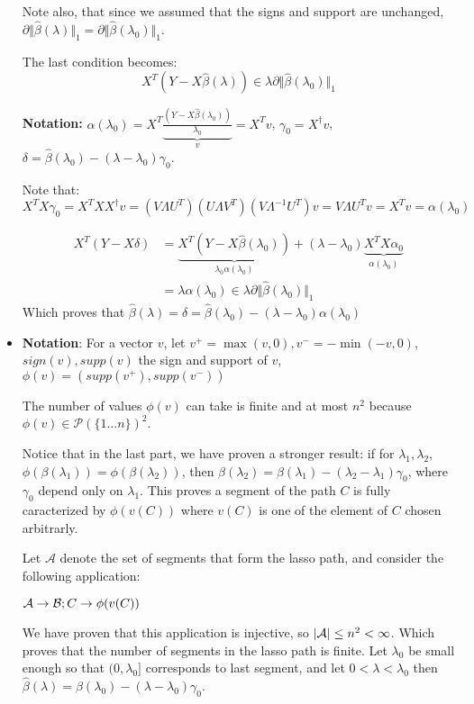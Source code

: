 \documentclass[12pt]{article}
\newcommand{\hbeta}{\hat \beta }
\newcommand{\norm}[1]{\Vert #1 \Vert}
\begin{document}
\begin{itemize}
  Note also, that since we assumed that the signs and support are unchanged, $\partial \norm{\hat \beta(\lambda)}_1 = \partial \norm{\hat \beta(\lambda_0)}_1$.
  
  The last condition becomes:
  $$X^T(Y - X\hat \beta(\lambda)) \in \lambda \partial \norm{\hat \beta(\lambda_0)}_1$$


  \textbf{Notation: } $ \alpha(\lambda_0) =  X^T \underbrace{\frac{(Y - X\hat \beta(\lambda_0))}{\lambda_0}}_v = X^Tv$,  $\gamma_0 = X^{\dagger} v$, $\delta = \hat \beta(\lambda_0) - (\lambda - \lambda_0) \gamma_0$. 

  Note that:
  $$X^TX\gamma_0 = X^T XX^{\dagger} v = (V \Lambda U^T) (U\Lambda V^T)  (V \Lambda^{-1} U^T) v = V \Lambda U^T v = X^T v = \alpha(\lambda_0)$$
  
  
  \begin{align*}
    X^T(Y - X\delta)
    &= \underbrace{X^T(Y - X\hat \beta(\lambda_0))}_{\lambda_0 \alpha(\lambda_0)} + (\lambda - \lambda_0) \underbrace{X^T X \alpha_0}_{\alpha(\lambda_0)}
    \\&= \lambda \alpha(\lambda_0) \in \lambda \partial \norm{\hat \beta(\lambda_0)}_1
  \end{align*}
  Which proves that $\hat \beta(\lambda) = \delta = \hat \beta(\lambda_0) - (\lambda - \lambda_0) \alpha(\lambda_0)$

  
\item
  \textbf{Notation}: For a vector $v$, let $v^+ = \max(v, 0), v^- = -\min(-v, 0)$, $sign(v), supp(v)$ the sign and support of $v$, $\phi(v) = (supp(v^+), supp(v^-))$
  
  The number of values $\phi(v)$ can take is finite and at most $n^2$ because $\phi(v) \in \mathcal P(\{1 \ldots n\})^2$.

  Notice that in the last part, we have proven a stronger result:
  if for $\lambda_1, \lambda_2$, $\phi(\beta(\lambda_1)) = \phi(\beta(\lambda_2))$, then $\beta(\lambda_2) = \beta(\lambda_1) - (\lambda_2 - \lambda_1) \gamma_0$, where $\gamma_0$ depend only on $\lambda_1$. This proves a segment of the path $C$ is fully caracterized by $\phi(v(C))$ where $v(C)$ is one of the element of $C$ chosen arbitrarly.
  

  Let $\mathcal A$ denote the set of segments that form the lasso path, and consider the following application:
  
  ${\cal A} \rightarrow {\cal B}; C \rightarrow \phi(v(C)) $  

  We have proven that this application is injective, so $|{\cal A}| \le n^2 < \infty $. Which proves that the number of segments in the lasso path is finite.
  Let $\lambda_0$ be small enough so that $(0, \lambda_0]$ corresponds to last segment, and let $0 < \lambda < \lambda_0$
  then $\hbeta(\lambda) = \hbeta(\lambda_0) - (\lambda - \lambda_0)\gamma_0$.


\end{itemize}
\end{document}
